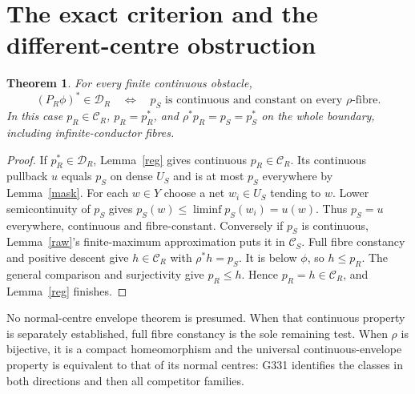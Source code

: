 \documentclass[11pt]{article}
\newtheorem{theorem}{Theorem}
\newcommand{\C}{\mathcal C}
\newcommand{\D}{\mathcal D}
\begin{document}
\section{The exact criterion and the different-centre obstruction}
\begin{theorem}\label{criterion}
For every finite continuous obstacle,
\[
 (P_R\phi)^*\in\D_R
 \quad\Longleftrightarrow\quad
 p_S\text{ is continuous and constant on every }\rho\text{-fibre}.
\]
In this case $p_R\in\C_R$, $p_R=p_R^*$, and $\rho^*p_R=p_S=p_S^*$
on the whole boundary, including infinite-conductor fibres.
\end{theorem}
\begin{proof}
If $p_R^*\in\D_R$, Lemma~\ref{reg} gives continuous $p_R\in\C_R$.
Its continuous pullback $u$ equals $p_S$ on dense $U_S$ and is at most $p_S$
everywhere by Lemma~\ref{mask}. For each $w\in Y$ choose a net $w_i\in U_S$
tending to $w$. Lower semicontinuity of $p_S$ gives
$p_S(w)\le\liminf p_S(w_i)=u(w)$. Thus $p_S=u$ everywhere, continuous and
fibre-constant.
Conversely if $p_S$ is continuous, Lemma~\ref{raw}'s finite-maximum
approximation puts it in $\C_S$. Full fibre constancy and positive descent
give $h\in\C_R$ with $\rho^*h=p_S$. It is below $\phi$, so $h\le p_R$.
The general comparison and surjectivity give $p_R\le h$. Hence $p_R=h\in\C_R$,
and Lemma~\ref{reg} finishes.
\end{proof}

No normal-centre envelope theorem is presumed. When that continuous property
is separately established, full fibre constancy is the sole remaining test.
When $\rho$ is bijective, it is a compact homeomorphism and the universal
continuous-envelope property is equivalent to that of its normal centres:
G331 identifies the classes in both directions and then all competitor families.
\end{document}
